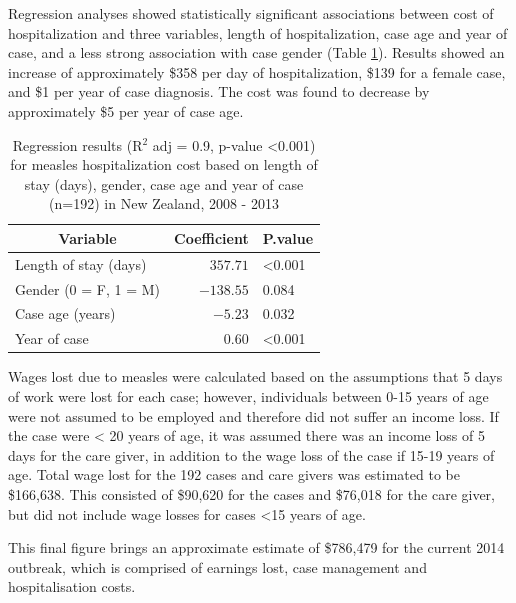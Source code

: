 \documentclass{article}
\begin{document}
Regression analyses showed statistically significant associations between cost of hospitalization and three variables, length of hospitalization, case age and year of case, and a less strong association with case gender (Table \ref{table:regression}). Results showed an increase of approximately \$358 per day of hospitalization, \$139 for a female case, and \$1 per year of case diagnosis. The cost was found to decrease by approximately \$5 per year of case age.


\begin{table}
\caption{Regression results (R$^{2}$ adj = 0.9, p-value <0.001) for measles hospitalization cost based on length of stay (days), gender, case age and year of case (n=192) in New Zealand, 2008 - 2013}
\begin{center}
\begin{tabular}{lrl}
\hline\hline
\multicolumn{1}{c}{Variable}&\multicolumn{1}{c}{Coefficient}&\multicolumn{1}{c}{P.value}\tabularnewline
\hline
Length of stay (days)&$ 357.71$&\textless  0.001\tabularnewline
Gender (0 = F, 1 = M)&$-138.55$&0.084\tabularnewline
Case age (years)&$  -5.23$&0.032\tabularnewline
Year of case&$   0.60$&\textless  0.001\tabularnewline
\hline
\end{tabular}\end{center}\label{table:regression}
\end{table}

Wages lost due to measles were calculated based on the assumptions that 5 days of work were lost for each case; however, individuals between 0-15 years of age were not assumed to be employed and therefore did not suffer an income loss. If the case were < 20 years of age, it was assumed there was an income loss of 5 days for the care giver, in addition to the wage loss of the case if 15-19 years of age. Total wage lost for the 192 cases and care givers was estimated to be \$166,638. This consisted of \$90,620 for the cases and \$76,018 for the care giver, but did not include wage losses for cases <15 years of age.

This final figure brings an approximate estimate of \$786,479 for the current 2014 outbreak, which is comprised of earnings lost, case management and hospitalisation costs.
\end{document}
